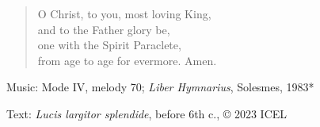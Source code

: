 \hymn



\setlength{\vleftmargin}{2em}
\begin{verse}
  O Christ, to you, most loving King,\\ 
  and to the Father glory be,\\ 
  one with the Spirit Paraclete,\\
  from age to age for evermore. Amen.
\end{verse}
\setlength{\vleftmargin}{\defleftmargini}

\begin{hymnsource}
Music: Mode IV, melody 70; \emph{Liber Hymnarius}, Solesmes, 1983*

Text: \emph{Lucis largitor splendide}, before 6th c., © 2023 ICEL
\end{hymnsource}
